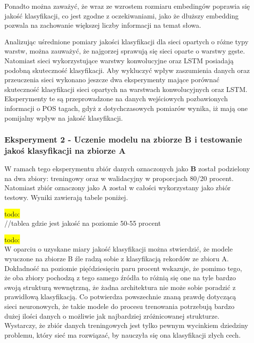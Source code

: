 Ponadto można zaważyć, że wraz ze wzrostem rozmiaru embedingów poprawia się jakość klasyfikacji, co jest zgodne z oczekiwaniami, jako że dłuższy embedding pozwala na zachowanie większej liczby informacji na temat słowa.


Analizując uśrednione pomiary jakości klasyfikacji dla sieci opartych o różne typy warstw, można zauważyć, że najgorzej sprawują się sieci oparte o warstwy gęste. Natomiast sieci wykorzystujące warstwy konwolucyjne oraz LSTM posiadają podobną skuteczność klasyfikacji. Aby wykluczyć wpływ zaszumienia danych oraz przeuczenia sieci wykonano jeszcze dwa eksperymenty mające porównać skuteczność klasyfikacji sieci opartych na warstwach konwolucyjnych oraz LSTM. Eksperymenty te są przeprowadzone na danych wejściowych pozbawionych informacji o POS tagach, gdyż z dotychczasowych pomiarów wynika, iż mają one pomijalny wpływ na jakość klasyfikacji.


\subsubsection{Eksperyment 2 - Uczenie modelu na zbiorze B i testowanie jakoś klasyfikacji na zbiorze A }

W ramach tego eksperymentu zbiór danych oznaczonych jako \textbf{B} został podzielony na dwa zbiory: treningowy oraz w walidacyjny w proporcjach 80/20 procent. Natomiast zbiór oznaczony jako A został w całości wykorzystany jako zbiór testowy. Wyniki zawierają tabele poniżej.

\colorbox{yellow}{todo:}\\
//tablea gdzie jest jakość na poziomie 50-55 procent

\colorbox{yellow}{todo:}\\
W oparciu o uzyskane miary jakość klasyfikacji można stwierdzić, że modele wyuczone na zbiorze B źle radzą sobie z klasyfikacją rekordów ze zbioru A. Dokładność na poziomie pięćdziesięciu paru procent wskazuje, że pomimo tego, że oba zbiory pochodzą z tego samego źródła to różnią się one na tyle bardzo swoją strukturą wewnętrzną, że żadna architektura nie może sobie poradzić z prawidłową klasyfikacją. Co potwierdza powszechnie znaną prawdę dotyczącą sieci neuronowych, że takie modele do procesu trenowania potrzebują bardzo dużej ilości danych o możliwie jak najbardziej zróżnicowanej strukturze. Wystarczy, że zbiór danych treningowych jest tylko pewnym wycinkiem dziedziny problemu, który sieć ma rozwiązać, by nauczyła się ona klasyfikacji złych cech.



